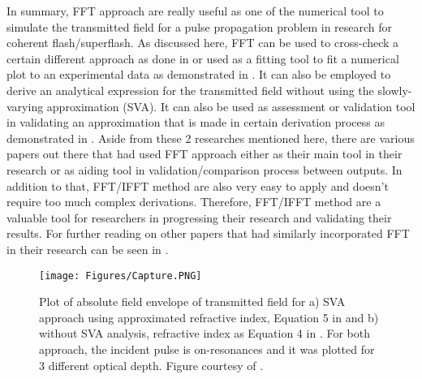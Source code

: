 In summary, FFT approach are really useful as one of the numerical tool to simulate the transmitted field for a pulse propagation problem in research for coherent flash/superflash. As discussed here, FFT can be used to cross-check a certain different approach as done in \cite{Jeong2010} or used as a fitting tool to fit a numerical plot to an experimental data as demonstrated in \cite{Chen2010}. It can also be employed to derive an analytical expression for the transmitted field without using the slowly-varying approximation (SVA). It can also be used as assessment or validation tool in validating an approximation that is made in certain derivation process as demonstrated in \cite{Jeong2008}. Aside from these 2 researches mentioned here, there are various papers out there that had used FFT approach either as their main tool in their research or as aiding tool in validation/comparison process between outputs. In addition to that, FFT/IFFT method are also very easy to apply and doesn't require too much complex derivations. Therefore, FFT/IFFT method are a valuable tool for researchers in progressing their research and validating their results. For further reading on other papers that had similarly incorporated FFT in their research can be seen in \cite{Jeong2019, Jeong2010, Chen2010, Macke2015, Oughstun2010, Wei2009, MacKe2009}.

\begin{figure}[h!]
    \centering
    \texttt{[image: Figures/Capture.PNG]}
    \caption{Plot of absolute field envelope of transmitted field for a) SVA approach using approximated refractive index, Equation 5 in \cite{Jeong2008} and b) without SVA analysis, refractive index as Equation 4 in \cite{Jeong2008}. For both approach, the incident pulse is on-resonances and it was plotted for 3 different optical depth. Figure courtesy of \cite{Jeong2008}.}
    \label{fig: svafft}
\end{figure}
